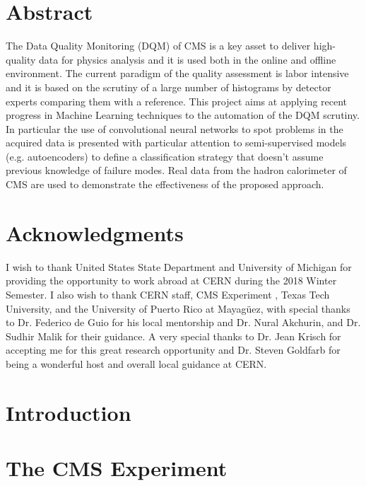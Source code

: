 \documentclass[12pt,twoside,openany]{book}
\begin{document}


\frontmatter

\doublespace
\chapter{Abstract}
The Data Quality Monitoring (DQM) of CMS is a key asset to deliver high-quality data for physics analysis and it is used both in the online and offline environment. The current paradigm of the quality assessment is labor intensive and it is based on the scrutiny of a large number of histograms by detector experts comparing them with a reference. This project aims at applying recent progress in Machine Learning techniques to the automation of the DQM scrutiny. In particular the use of convolutional neural networks to spot problems in the acquired data is presented with particular attention to semi-supervised models (e.g. autoencoders) to define a classification strategy that doesn’t assume previous knowledge of failure modes. Real data from the hadron calorimeter of CMS are used to demonstrate the effectiveness of the proposed approach. 
	

\chapter{Acknowledgments}

I wish to thank United States State Department and University of Michigan for providing the opportunity to work abroad at CERN during the 2018 Winter Semester. I also wish to thank CERN staff, CMS Experiment , Texas Tech University, and the University of Puerto Rico at Mayagüez, with special thanks to Dr. Federico de Guio for his local mentorship and Dr. Nural Akchurin, and Dr. Sudhir Malik for their guidance. A very special thanks to Dr. Jean Krisch for accepting me for this great research opportunity and Dr. Steven Goldfarb for being a wonderful host and overall local guidance at CERN.
\singlespace

\listoffigures

\tableofcontents


\doublespace
\mainmatter
\chapter{Introduction}


\chapter{The CMS Experiment}\label{LHCCMS}

\end{document}
